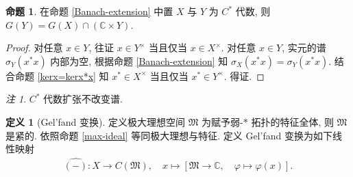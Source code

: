 \documentclass{MainStyle}
\theoremstyle{definition}
\theoremstyle{definition}
\theoremstyle{definition}
\newtheorem{definition}{定义}
\theoremstyle{definition}
\newtheorem{proposition}{命题}
\theoremstyle{definition}
\theoremstyle{definition}
\theoremstyle{definition}
\theoremstyle{remark}
\newtheorem{remark}{注}
\theoremstyle{remark}
\begin{document}
\begin{proposition}
    在命题 \ref{Banach-extension} 中置 $X$ 与 $Y$ 为 $C^\ast$ 代数, 则 $G(Y)=G(X)\cap (\mathbb C\times Y)$.
    \begin{proof}
        对任意 $x\in Y$, 往证 $x\in Y^\times$ 当且仅当 $x\in X^\times$. 对任意 $x\in Y$, 实元的谱 $\sigma_Y(x^\ast x)$ 内部为空, 根据命题 \ref{Banach-extension} 知 $\sigma_X(x^\ast x)=\sigma_Y(x^\ast x)$. 结合命题 \ref{kerx=kerx*x} 知 $x^\ast \in X^\times $ 当且仅当 $x^\ast \in Y^\times$. 得证.
    \end{proof}
\end{proposition}

\begin{remark}
    $C^\ast$ 代数扩张不改变谱.
\end{remark}

\begin{definition}[Gel'fand 变换]\label{Gel'fand}
    定义极大理想空间 $\mathfrak M$ 为赋予弱-$\ast$ 拓扑的特征全体, 则 $\mathfrak M$ 是紧的. 依照命题 \ref{max-ideal} 等同极大理想与特征. 定义 Gel'fand 变换为如下线性映射
    \begin{align*}
        \widehat{(-)}:X\to C(\mathfrak M),\quad x\mapsto [\mathfrak M\to \mathbb C,\quad \varphi \mapsto \varphi (x)].
    \end{align*}
\end{definition}
\end{document}
